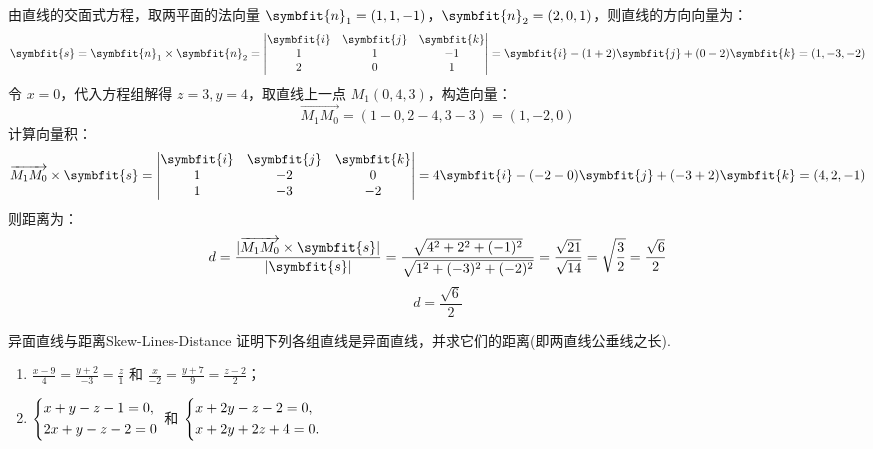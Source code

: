 \begin{solution}
    由直线的交面式方程，取两平面的法向量 $\symbfit{n}_1 = (1, 1, -1)$，$\symbfit{n}_2 = (2, 0, 1)$，则直线的方向向量为：
    \begin{equation}
        \symbfit{s} = \symbfit{n}_1 \times \symbfit{n}_2 = \begin{vmatrix} \symbfit{i} & \symbfit{j} & \symbfit{k} \\ 1 & 1 & -1 \\ 2 & 0 & 1 \end{vmatrix} = \symbfit{i} - (1 + 2)\symbfit{j} + (0 - 2)\symbfit{k} = (1, -3, -2)
    \end{equation}
    令 $x = 0$，代入方程组解得 $z = 3, y = 4$，取直线上一点 $M_1(0, 4, 3)$，构造向量：
    \begin{equation}
        \overrightarrow{M_1M_0} = (1 - 0, 2 - 4, 3 - 3) = (1, -2, 0)
    \end{equation}
    计算向量积：
    \begin{equation}
        \overrightarrow{M_1M_0} \times \symbfit{s} = \begin{vmatrix} \symbfit{i} & \symbfit{j} & \symbfit{k} \\ 1 & -2 & 0 \\ 1 & -3 & -2 \end{vmatrix} = 4\symbfit{i} - (-2 - 0)\symbfit{j} + (-3 + 2)\symbfit{k} = (4, 2, -1)
    \end{equation}
    则距离为：
    \begin{equation}
        d = \frac{|\overrightarrow{M_1M_0} \times \symbfit{s}|}{|\symbfit{s}|} = \frac{\sqrt{4^2 + 2^2 + (-1)^2}}{\sqrt{1^2 + (-3)^2 + (-2)^2}} = \frac{\sqrt{21}}{\sqrt{14}} = \sqrt{\frac{3}{2}} = \frac{\sqrt{6}}{2}
    \end{equation}
    \begin{equation}
        \boxed{d = \frac{\sqrt{6}}{2}}
    \end{equation}
\end{solution}


\begin{problem}{异面直线与距离}{Skew-Lines-Distance}
    证明下列各组直线是异面直线，并求它们的距离(即两直线公垂线之长).
    \begin{enumerate}
        \item $\frac{x - 9}{4} = \frac{y + 2}{-3} = \frac{z}{1}$ 和 $\frac{x}{-2} = \frac{y + 7}{9} = \frac{z - 2}{2}$；
        \item $\begin{dcases} x + y - z - 1 = 0, \\ 2x + y - z - 2 = 0 \end{dcases}$ 和 $\begin{dcases} x + 2y - z - 2 = 0, \\ x + 2y + 2z + 4 = 0. \end{dcases}$
    \end{enumerate}
\end{problem}

